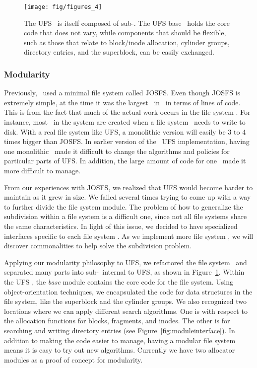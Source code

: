 \begin{figure}[htb]
  \centering
  \texttt{[image: fig/figures\_4]}
  \caption{\label{fig:ufsmodules} The UFS \module\ is itself composed of
  sub-\modules. The UFS base \module\ holds the core code that does not
  vary, while components that should be flexible, such as those that relate
  to block/inode allocation, cylinder groups, directory entries, and the
  superblock, can be easily exchanged.}
\end{figure}

\subsubsection {Modularity}
Previously, \Kudos\ used a minimal file system called JOSFS. Even though JOSFS
is extremely simple, at the time it was the largest \module\ in \Kudos\ in
terms of lines of code. This is from the fact that much of the actual work
occurs in the file system \modules. For instance, most \chdescs\ in the system
are created when a file system \module\ needs to write to disk. With a real
file system like UFS, a monolithic version will easily be 3 to 4 times bigger
than JOSFS. In earlier version of the \Kudos\ UFS implementation, having one
monolithic \module\ made it difficult to change the algorithms and policies
for particular parts of UFS. In addition, the large amount of code for one
\module\ made it more difficult to manage.

From our experiences with JOSFS, we realized that UFS would become harder to
maintain as it grew in size. We failed several times trying to come up with a
way to further divide the file system module. The problem of how to generalize
the subdivision within a file system is a difficult one, since not all file
systems share the same characteristics. In light of this issue, we decided to
have specialized interfaces specific to each file system \module. As we
implement more file system \modules, we will discover commonalities to help
solve the subdivision problem.

Applying our modularity philosophy to UFS, we refactored the file system
\module\ and separated many parts into sub-\modules\ internal to UFS, as shown
in Figure~\ref{fig:ufsmodules}. Within the UFS \module, the \emph{base} module
contains the core code for the file system. Using object-orientation
techniques, we encapsulated the code for data structures in the file system,
like the superblock and the cylinder groups. We also recognized two locations
where we can apply different search algorithms. One is with respect to the
allocation functions for blocks, fragments, and inodes. The other is for
searching and writing directory entries (see Figure~\ref{fig:moduleinterface}).
In addition to making the code easier to manage, having a modular file system
means it is easy to try out new algorithms. Currently we have two allocator
modules as a proof of concept for modularity.

